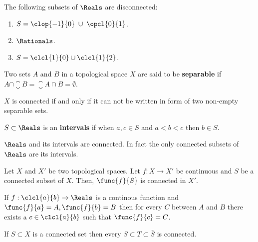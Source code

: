 \begin{definition}

\end{definition}
\begin{example}
    The following subsets of \(\Reals\) are disconnected:
    \begin{enumerate}
        \item \(S =\clop{-1}{0} \;\cup\; \opcl{0}{1}\).
        \item \(\Rationals\).
        \item \(S = \clcl{1}{0} \cup \clcl{1}{2}\).
    \end{enumerate}
\end{example}

\begin{definition}
    Two sets \(A\) and \(B\) in a topological space \(X\) are said to be \textbf{separable} if \(A \cap \closure B = \closure A \cap B = \emptyset\).
\end{definition}

\begin{proposition}
    \(X\) is connected if and only if it can not be written in form of two non-empty separable sets.
\end{proposition}

\begin{definition}
    \(S \subset \Reals\) is an \textbf{intervals} if when \(a , c \in S\) and \(a < b < c\) then \(b \in S\).
\end{definition}
\begin{example}
    \(\Reals\) and its intervals are connected. In fact the only connected subsets of \(\Reals\) are its intervals.
\end{example}
\begin{theorem}
    Let \(X\) and \(X'\) be two topological spaces. Let \(f : X \to X'\) be continuous and \(S\) be a connected subset of \(X\). Then, \(\func{f}{S}\) is connected in \(X'\).
\end{theorem}

\begin{corollary} 
    If \(f : \clcl{a}{b} \to \Reals\) is a continous function and \(\func{f}{a} = A, \func{f}{b} = B\) then for every \(C\) between \(A\) and \(B\) there exists a \(c \in \clcl{a}{b}\) such that \(\func{f}{c} = C\).
\end{corollary}
\begin{proposition}
    If \(S \subset X\) is a connected set then every \(S \subset T \subset \bar{S}\) is connected.
\end{proposition}

